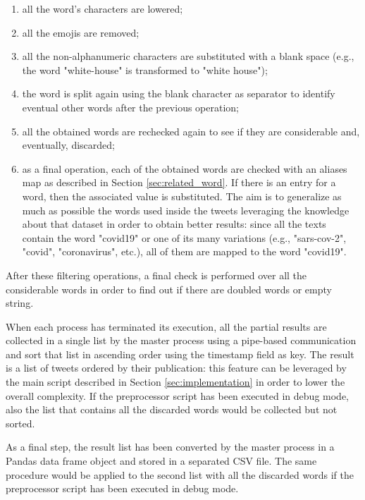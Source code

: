 \begin{description}
	\begin{enumerate}
		\item all the word's characters are lowered;
		\item all the emojis are removed;
		\item all the non-alphanumeric characters are substituted with a blank space (e.g., the word "white-house" is transformed to "white house");
		\item the word is split again using the blank character as separator to identify eventual other words after the previous operation;
		\item all the obtained words are rechecked again to see if they are considerable and, eventually, discarded;
		\item as a final operation, each of the obtained words are checked with an aliases map as described in Section \ref{sec:related_word}. If there is an entry for a word, then the associated value is substituted. The aim is to generalize as much as possible the words used inside the tweets leveraging the knowledge about that dataset in order to obtain better results: since all the texts contain the word "covid19" or one of its many variations (e.g., "sars-cov-2", "covid", "coronavirus", etc.), all of them are mapped to the word "covid19".
	\end{enumerate}
	After these filtering operations, a final check is performed over all the considerable words in order to find out if there are doubled words or empty string. 
\end{description}

When each process has terminated its execution, all the partial results are collected in a single list by the master process using a pipe-based communication and sort that list in ascending order using the timestamp field as key. The result is a list of tweets ordered by their publication: this feature can be leveraged by the main script described in Section \ref{sec:implementation} in order to lower the overall complexity. If the preprocessor script has been executed in debug mode, also the list that contains all the discarded words would be collected but not sorted.

As a final step, the result list has been converted by the master process in a Pandas \cite{python-pandas} data frame object and stored in a separated CSV file. The same procedure would be applied to the second list with all the discarded words if the preprocessor script has been executed in debug mode.

